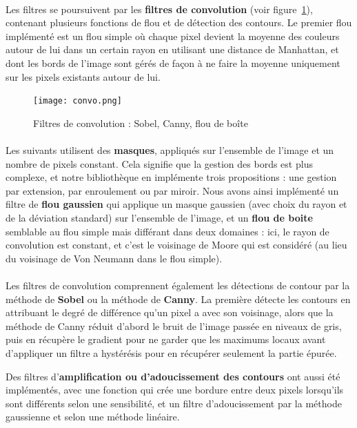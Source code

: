 \documentclass[a4paper]{article}
\begin{document}
\paragraph{}
Les filtres se poursuivent par les \textbf{filtres de convolution} (voir figure~\ref{fig:convolution}), contenant plusieurs fonctions de flou et de détection des contours. Le premier flou implémenté est un flou simple où chaque pixel devient la moyenne des couleurs autour de lui dans un certain rayon en utilisant une distance de Manhattan, et dont les bords de l'image sont gérés de façon à ne faire la moyenne uniquement sur les pixels existants autour de lui. 

\begin{figure}
    \centering
    \texttt{[image: convo.png]}
    \caption{Filtres de convolution : Sobel, Canny, flou de boîte}
    \label{fig:convolution}
\end{figure}

\paragraph{}
Les suivants utilisent des \textbf{masques}, appliqués sur l'ensemble de l'image et un nombre de pixels constant. Cela signifie que la gestion des bords est plus complexe, et notre bibliothèque en implémente trois propositions : une gestion par extension, par enroulement ou par miroir. Nous avons ainsi implémenté un filtre de \textbf{flou gaussien} qui applique un masque gaussien (avec choix du rayon et de la déviation standard) sur l'ensemble de l'image, et un \textbf{flou de boite} semblable au flou simple mais différant dans deux domaines : ici, le rayon de convolution est constant, et c'est le voisinage de Moore qui est considéré (au lieu du voisinage de Von Neumann dans le flou simple).

\paragraph{}
Les filtres de convolution comprennent également les détections de contour par la méthode de \textbf{Sobel} ou la méthode de \textbf{Canny}. La première détecte les contours en attribuant le degré de différence qu'un pixel a avec son voisinage, alors que la méthode de Canny réduit d'abord le bruit de l'image passée en niveaux de gris, puis en récupère le gradient pour ne garder que les maximums locaux avant d'appliquer un filtre a hystérésis pour en récupérer seulement la partie épurée.

\textbf{}
Des filtres d'\textbf{amplification ou d'adoucissement des contours} ont aussi été implémentés, avec une fonction qui crée une bordure entre deux pixels lorsqu'ils sont différents selon une sensibilité, et un filtre d'adoucissement par la méthode gaussienne et selon une méthode linéaire.
\end{document}
